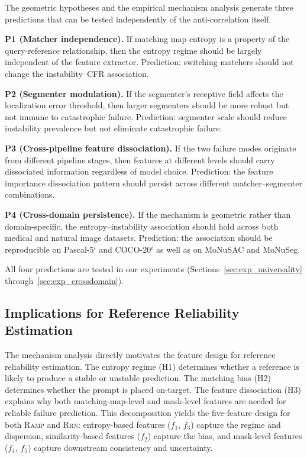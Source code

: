 \documentclass[10pt,twocolumn,letterpaper]{article}
\newcommand{\RAMP}{\textsc{Ramp}}
\newcommand{\RRN}{\textsc{Rrn}}
\begin{document}
The geometric hypotheses and the empirical mechanism analysis generate three
predictions that can be tested independently of the anti-correlation itself.

\textbf{P1 (Matcher independence).} If matching map entropy is a property of
the query-reference relationship, then the entropy regime should be largely
independent of the feature extractor. Prediction: switching matchers should
not change the instability--CFR association.

\textbf{P2 (Segmenter modulation).} If the segmenter's receptive field
affects the localization error threshold, then larger segmenters should be
more robust but not immune to catastrophic failure. Prediction: segmenter
scale should reduce instability prevalence but not eliminate catastrophic
failure.

\textbf{P3 (Cross-pipeline feature dissociation).} If the two failure modes
originate from different pipeline stages, then features at different levels
should carry dissociated information regardless of model choice. Prediction:
the feature importance dissociation pattern should persist across different
matcher--segmenter combinations.

\textbf{P4 (Cross-domain persistence).} If the mechanism is geometric rather
than domain-specific, the entropy--instability association should hold across
both medical and natural image datasets. Prediction: the association should
be reproducible on Pascal-5$^i$ and COCO-20$^i$ as well as on MoNuSAC and
MoNuSeg.

All four predictions are tested in our experiments (Sections~\ref{sec:exp_universality}
through~\ref{sec:exp_crossdomain}).

\subsection{Implications for Reference Reliability Estimation}

The mechanism analysis directly motivates the feature design for reference
reliability estimation. The entropy regime (H1) determines whether a
reference is likely to produce a stable or unstable prediction. The
matching bias (H2) determines whether the prompt is placed on-target. The
feature dissociation (H3) explains why both matching-map-level and
mask-level features are needed for reliable failure prediction. This
decomposition yields the five-feature design for both \RAMP{} and \RRN{}:
entropy-based features ($f_1$, $f_3$) capture the regime and dispersion,
similarity-based features ($f_2$) capture the bias, and mask-level features
($f_4$, $f_5$) capture downstream consistency and uncertainty.
\end{document}
